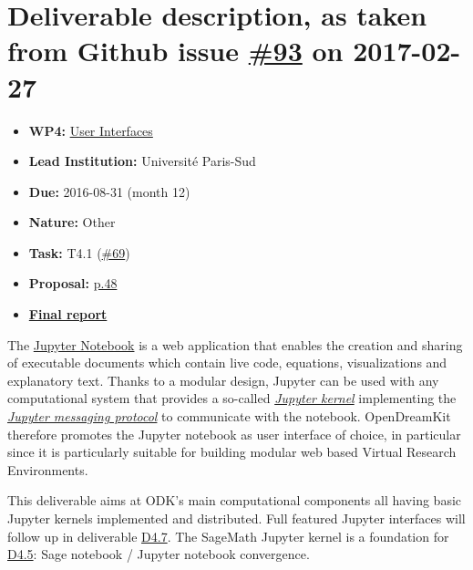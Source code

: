 \section*{\texorpdfstring{Deliverable description, as taken from Github
issue
\href{https://github.com/OpenDreamKit/OpenDreamKit/issues/93}{\#93} on
2017-02-27}{Deliverable description, as taken from Github issue \#93 on 2017-02-27}}\label{deliverable-description-as-taken-from-github-issue-93-on-2017-02-27}

\begin{itemize}
\tightlist
\item
  \textbf{WP4:}
  \href{https://github.com/OpenDreamKit/OpenDreamKit/tree/master/WP4}{User
  Interfaces}
\item
  \textbf{Lead Institution:} Université Paris-Sud
\item
  \textbf{Due:} 2016-08-31 (month 12)
\item
  \textbf{Nature:} Other
\item
  \textbf{Task:} T4.1
  (\href{https://github.com/OpenDreamKit/OpenDreamKit/issues/69}{\#69})
\item
  \textbf{Proposal:}
  \href{https://github.com/OpenDreamKit/OpenDreamKit/raw/master/Proposal/proposal-www.pdf}{p.48}
\item
  \textbf{\href{https://github.com/OpenDreamKit/OpenDreamKit/raw/master/WP4/D4.4/report-final.pdf}{Final
  report}}
\end{itemize}

The \href{https://jupyter.org}{Jupyter Notebook} is a web application
that enables the creation and sharing of executable documents which
contain live code, equations, visualizations and explanatory text.
Thanks to a modular design, Jupyter can be used with any computational
system that provides a so-called
\href{https://jupyter.readthedocs.io/en/latest/projects/kernels.html}{\emph{Jupyter
kernel}} implementing the
\href{https://jupyter-client.readthedocs.io/en/latest/}{\emph{Jupyter
messaging protocol}} to communicate with the notebook. OpenDreamKit
therefore promotes the Jupyter notebook as user interface of choice, in
particular since it is particularly suitable for building modular web
based Virtual Research Environments.

This deliverable aims at ODK's main computational components all having
basic Jupyter kernels implemented and distributed. Full featured Jupyter
interfaces will follow up in deliverable
\href{https://github.com/OpenDreamKit/OpenDreamKit/issues/96}{D4.7}. The
SageMath Jupyter kernel is a foundation for
\href{https://github.com/OpenDreamKit/OpenDreamKit/issues/94}{D4.5}:
Sage notebook / Jupyter notebook convergence.

